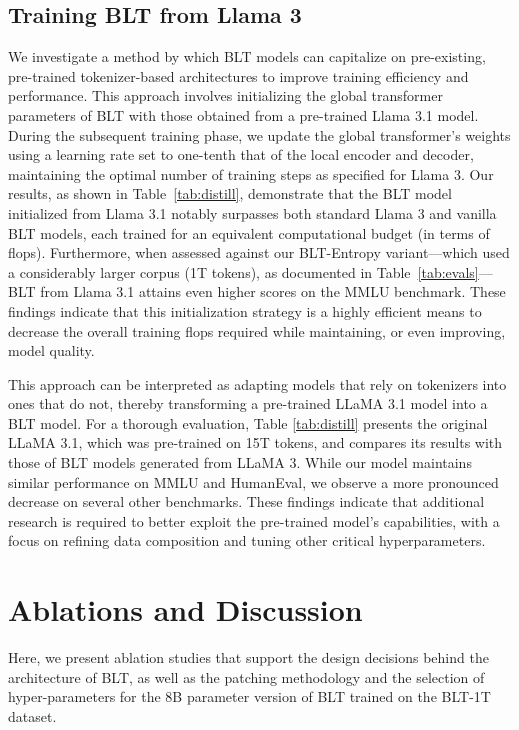 \subsection{Training {\textsc BLT} from Llama 3}
\label{sec:distillation}
We investigate a method by which {\textsc BLT} models can capitalize on pre-existing, pre-trained tokenizer-based architectures to improve training efficiency and performance. This approach involves initializing the global transformer parameters of {\textsc BLT} with those obtained from a pre-trained Llama 3.1 model. During the subsequent training phase, we update the global transformer's weights using a learning rate set to one-tenth that of the local encoder and decoder, maintaining the optimal number of training steps as specified for Llama 3. Our results, as shown in Table~\ref{tab:distill}, demonstrate that the {\textsc BLT} model initialized from Llama 3.1 notably surpasses both standard Llama 3 and vanilla {\textsc BLT} models, each trained for an equivalent computational budget (in terms of flops). Furthermore, when assessed against our {\textsc BLT}-Entropy variant—which used a considerably larger corpus (1T tokens), as documented in Table~\ref{tab:evals}—{\textsc BLT} from Llama 3.1 attains even higher scores on the MMLU benchmark. These findings indicate that this initialization strategy is a highly efficient means to decrease the overall training flops required while maintaining, or even improving, model quality.

This approach can be interpreted as adapting models that rely on tokenizers into ones that do not, thereby transforming a pre-trained LLaMA 3.1 model into a {\textsc BLT} model. For a thorough evaluation, Table \ref{tab:distill} presents the original LLaMA 3.1, which was pre-trained on 15T tokens, and compares its results with those of {\textsc BLT} models generated from LLaMA 3. While our model maintains similar performance on MMLU and HumanEval, we observe a more pronounced decrease on several other benchmarks. These findings indicate that additional research is required to better exploit the pre-trained model’s capabilities, with a focus on refining data composition and tuning other critical hyperparameters.

\section{Ablations and Discussion}
\label{section:ablations}
Here, we present ablation studies that support the design decisions behind the architecture of {\textsc BLT}, as well as the patching methodology and the selection of hyper-parameters for the 8B parameter version of {\textsc BLT} trained on the {\textsc BLT}-1T dataset.

